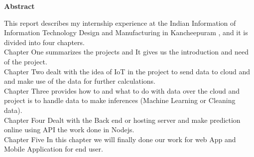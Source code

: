 \thispagestyle{plain}

\textbf{Abstract}

\vspace{1cm}
This report describes my internship experience at the Indian Information of Information Technology Design and Manufacturing in
Kancheepuram , and it is divided into four chapters.\\

Chapter One summarizes the projects and It gives us the introduction and need of the project.\\

Chapter Two dealt with the idea of IoT in the project to send data to cloud and and make use of the data for further calculations.\\

Chapter Three provides how to and what to do with data over the cloud and project is to handle data to make inferences (Machine Learning or Cleaning data).\\

Chapter Four Dealt with the Back end or hosting server and make prediction online using API the work done in Nodejs.\\

Chapter Five In this chapter we will finally done our work for web App and Mobile Application for end user.

